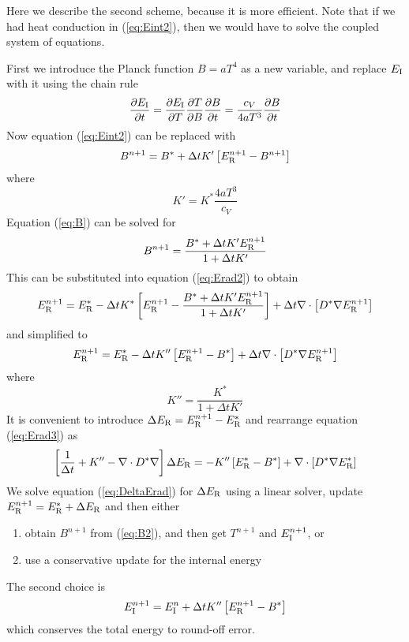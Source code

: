 \documentclass[12pt]{article}
\newcommand{\Eint}{E_{\rm I}}
\newcommand{\Erad}{E_{\rm R}}
\begin{document}
Here we describe the second scheme, because it is more efficient. 
Note that if we had heat conduction in (\ref{eq:Eint2}), 
then we would have to solve the coupled system of equations.

First we introduce the Planck function $B = a T^4$ as a new variable,
and replace $\Eint$ with it using the chain rule
\begin{equation}
\frac{\partial \Eint}{\partial t} = 
   \frac{\partial \Eint}{\partial T}
   \frac{\partial T}{\partial B}
   \frac{\partial B}{\partial t}
   = \frac{c_V}{4 a T^3}\frac{\partial B}{\partial t}
\end{equation}
Now equation (\ref{eq:Eint2}) can be replaced with
\begin{equation}
B^{n+1} = B^* + \Delta t K'\left[\Erad^{n+1} - B^{n+1}\right]  
   \label{eq:B}
\end{equation}
where
\begin{equation}
K' = K^* \frac{4 a T^3}{c_V}
\end{equation}
Equation (\ref{eq:B}) can be solved for
\begin{equation}
  B^{n+1} = \frac{B^* + \Delta t K' \Erad^{n+1}}{1 + \Delta t K'}
   \label{eq:B2}
\end{equation}
This can be substituted into equation (\ref{eq:Erad2}) to obtain
\begin{equation}
\Erad^{n+1} = \Erad^* - \Delta t K^*\left[\Erad^{n+1} 
              - \frac{B^* + \Delta t K' \Erad^{n+1}}{1 + \Delta t K'}\right]
                + \Delta t \nabla\cdot\left[ D^* \nabla \Erad^{n+1} \right]
\end{equation}
and simplified to
\begin{equation}
\Erad^{n+1} = \Erad^* - \Delta t K''\left[\Erad^{n+1} - B^*\right]
                + \Delta t \nabla\cdot\left[ D^* \nabla \Erad^{n+1} \right]
\label{eq:Erad3}
\end{equation}
where
\begin{equation}
K'' = \frac{K^*}{1 + \Delta t K'} 
\end{equation}
It is convenient to introduce $\Delta \Erad = \Erad^{n+1} - \Erad^*$ and
rearrange equation (\ref{eq:Erad3}) as
\begin{equation}
\left[\frac{1}{\Delta t} + K'' - \nabla\cdot D^* \nabla\right] \Delta \Erad 
   = - K''\left[\Erad^* - B^*\right]
                + \nabla\cdot\left[ D^* \nabla \Erad^* \right]
\label{eq:DeltaErad}
\end{equation}
We solve equation (\ref{eq:DeltaErad}) for $\Delta \Erad$
using a linear solver, update $\Erad^{n+1} = \Erad^* + \Delta \Erad$
and then either
\begin{enumerate}
\item obtain $B^{n+1}$ from (\ref{eq:B2}), and then get
 $T^{n+1}$ and $\Eint^{n+1}$, or
\item use a conservative update for the internal energy
\end{enumerate}
The second choice is
\begin{equation}
\Eint^{n+1} = \Eint^n + \Delta t K''\left[\Erad^{n+1} - B^*\right]
\end{equation}
which conserves the total energy to round-off error.
\end{document}
